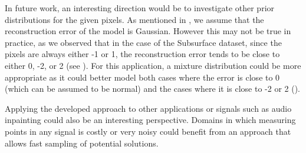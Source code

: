 In future work, an interesting direction would be to investigate other prior distributions for the given pixels. As mentioned in , we assume that the reconstruction error of the model is Gaussian. However this may not be true in practice, as we observed that in the case of the Subsurface dataset, since the pixels are always either -1 or 1, the reconstruction error tends to be close to either 0, -2, or 2 (see ). For this application, a mixture distribution could be more appropriate as it could better model both cases where the error is close to 0 (which can be assumed to be normal) and the cases where it is close to -2 or 2 (). 

Applying the developed approach to other applications or signals such as audio inpainting \citep{Marafioti2018} could also be an interesting perspective. Domains in which measuring points in any signal is costly or very noisy could benefit from an approach that allows fast sampling of potential solutions.
